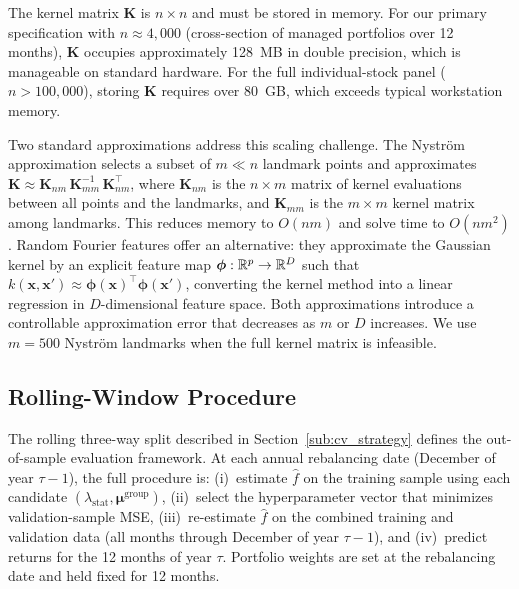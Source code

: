 The kernel matrix $\mathbf{K}$ is $n \times n$ and must be stored in memory.
For our primary specification with $n \approx 4{,}000$ (cross-section of managed portfolios over 12 months), $\mathbf{K}$ occupies approximately 128~MB in double precision, which is manageable on standard hardware.
For the full individual-stock panel ($n > 100{,}000$), storing $\mathbf{K}$ requires over 80~GB, which exceeds typical workstation memory.

Two standard approximations address this scaling challenge.
The Nystr\"{o}m approximation selects a subset of $m \ll n$ landmark points and approximates $\mathbf{K} \approx \mathbf{K}_{nm}\,\mathbf{K}_{mm}^{-1}\,\mathbf{K}_{nm}^\top$, where $\mathbf{K}_{nm}$ is the $n \times m$ matrix of kernel evaluations between all points and the landmarks, and $\mathbf{K}_{mm}$ is the $m \times m$ kernel matrix among landmarks.
This reduces memory to $O(nm)$ and solve time to $O(nm^2)$.
Random Fourier features offer an alternative: they approximate the Gaussian kernel by an explicit feature map $\bm{\phi}: \mathbb{R}^p \to \mathbb{R}^D$ such that $k(\mathbf{x}, \mathbf{x}') \approx \bm{\phi}(\mathbf{x})^\top \bm{\phi}(\mathbf{x}')$, converting the kernel method into a linear regression in $D$-dimensional feature space.
Both approximations introduce a controllable approximation error that decreases as $m$ or $D$ increases.
We use $m = 500$ Nystr\"{o}m landmarks when the full kernel matrix is infeasible.


\subsection{Rolling-Window Procedure}\label{sub:rolling}

The rolling three-way split described in Section~\ref{sub:cv_strategy} defines the out-of-sample evaluation framework.
At each annual rebalancing date (December of year $\tau - 1$), the full procedure is:
(i)~estimate $\hat{f}$ on the training sample using each candidate $(\lambda_{\mathrm{stat}}, \bm{\mu}^{\mathrm{group}})$,
(ii)~select the hyperparameter vector that minimizes validation-sample MSE,
(iii)~re-estimate $\hat{f}$ on the combined training and validation data (all months through December of year $\tau - 1$), and
(iv)~predict returns for the 12 months of year $\tau$.
Portfolio weights are set at the rebalancing date and held fixed for 12 months.

